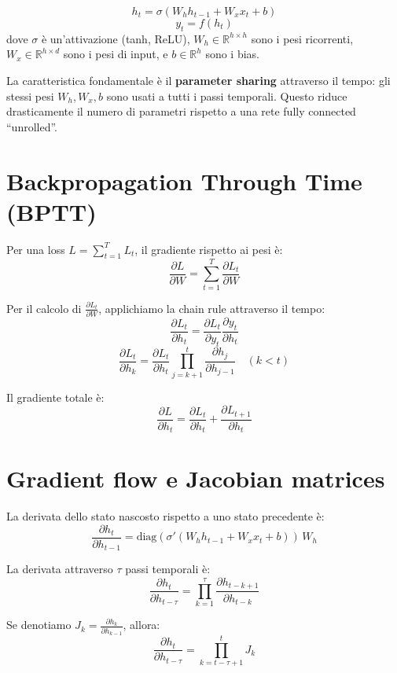 \begin{definition}
\[
h_t = \sigma(W_h h_{t-1} + W_x x_t + b)
\]
\[
y_t = f(h_t)
\]
dove $\sigma$ è un'attivazione (tanh, ReLU), $W_h \in \mathbb{R}^{h \times h}$ sono i pesi ricorrenti, $W_x \in \mathbb{R}^{h \times d}$ sono i pesi di input, e $b \in \mathbb{R}^h$ sono i bias.
\end{definition}

La caratteristica fondamentale è il \textbf{parameter sharing} attraverso il tempo: gli stessi pesi $W_h, W_x, b$ sono usati a tutti i passi temporali. Questo riduce drasticamente il numero di parametri rispetto a una rete fully connected ``unrolled''.

\section{Backpropagation Through Time (BPTT)}

Per una loss $L = \sum_{t=1}^{T} L_t$, il gradiente rispetto ai pesi è:
\[
\frac{\partial L}{\partial W} = \sum_{t=1}^{T} \frac{\partial L_t}{\partial W}
\]

Per il calcolo di $\frac{\partial L_t}{\partial W}$, applichiamo la chain rule attraverso il tempo:
\[
\frac{\partial L_t}{\partial h_t} = \frac{\partial L_t}{\partial y_t} \frac{\partial y_t}{\partial h_t}
\]
\[
\frac{\partial L_t}{\partial h_k} = \frac{\partial L_t}{\partial h_t} \prod_{j=k+1}^{t} \frac{\partial h_j}{\partial h_{j-1}} \quad (k < t)
\]

Il gradiente totale è:
\[
\frac{\partial L}{\partial h_t} = \frac{\partial L_t}{\partial h_t} + \frac{\partial L_{t+1}}{\partial h_t}
\]

\section{Gradient flow e Jacobian matrices}

\begin{tcolorbox}[title=Analisi del flusso dei gradienti]
La derivata dello stato nascosto rispetto a uno stato precedente è:
\[
\frac{\partial h_t}{\partial h_{t-1}} = \text{diag}(\sigma'(W_h h_{t-1} + W_x x_t + b)) \, W_h
\]

La derivata attraverso $\tau$ passi temporali è:
\[
\frac{\partial h_t}{\partial h_{t-\tau}} = \prod_{k=1}^{\tau} \frac{\partial h_{t-k+1}}{\partial h_{t-k}}
\]

Se denotiamo $J_k = \frac{\partial h_k}{\partial h_{k-1}}$, allora:
\[
\frac{\partial h_t}{\partial h_{t-\tau}} = \prod_{k=t-\tau+1}^{t} J_k
\]
\end{tcolorbox}

